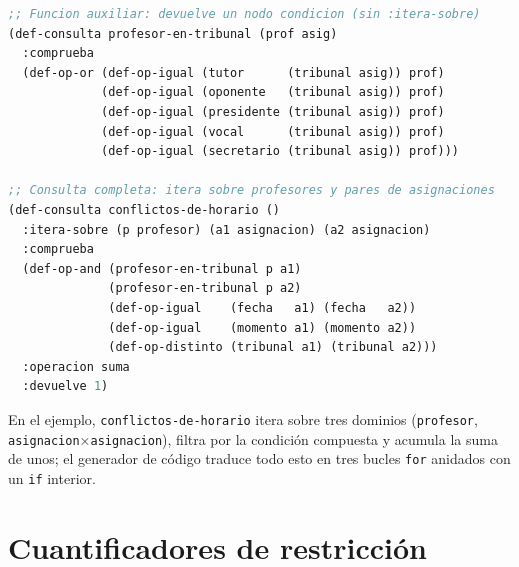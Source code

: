 \documentclass[12pt,a4paper]{report}
\begin{document}
\medskip
\noindent
{}

\begin{lstlisting}[language=CommonLisp,
  caption={Consulta que verifica si un profesor pertenece a un tribunal
           y consulta que cuenta conflictos de horario.}]
;; Funcion auxiliar: devuelve un nodo condicion (sin :itera-sobre)
(def-consulta profesor-en-tribunal (prof asig)
  :comprueba
  (def-op-or (def-op-igual (tutor      (tribunal asig)) prof)
             (def-op-igual (oponente   (tribunal asig)) prof)
             (def-op-igual (presidente (tribunal asig)) prof)
             (def-op-igual (vocal      (tribunal asig)) prof)
             (def-op-igual (secretario (tribunal asig)) prof)))

;; Consulta completa: itera sobre profesores y pares de asignaciones
(def-consulta conflictos-de-horario ()
  :itera-sobre (p profesor) (a1 asignacion) (a2 asignacion)
  :comprueba
  (def-op-and (profesor-en-tribunal p a1)
              (profesor-en-tribunal p a2)
              (def-op-igual    (fecha   a1) (fecha   a2))
              (def-op-igual    (momento a1) (momento a2))
              (def-op-distinto (tribunal a1) (tribunal a2)))
  :operacion suma
  :devuelve 1)
\end{lstlisting}



En el ejemplo, \texttt{conflictos-de-horario} itera sobre tres dominios
(\texttt{profesor}, \texttt{asignacion}×\texttt{asignacion}), filtra por
la condición compuesta y acumula la suma de unos; el generador de código
traduce todo esto en tres bucles \texttt{for} anidados con un \texttt{if}
interior.


\section{Cuantificadores de restricción}
\label{sec:cuantificadores}
\end{document}
